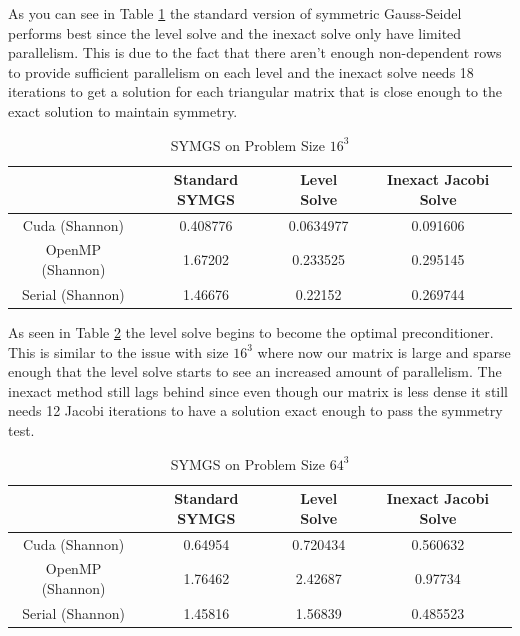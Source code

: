\documentclass{ccr15}
\begin{document}
As you can see in Table \ref{SYMGS16} the standard version of symmetric Gauss-Seidel performs
best since the level solve and the inexact solve only have limited parallelism. This is due to
the fact that there aren't enough non-dependent rows to provide sufficient parallelism on each
level and the inexact solve needs 18 iterations to get a solution for each triangular matrix that
is close enough to the exact solution to maintain symmetry.

\begin{table}[h]
\begin{center}
\begin{tabular}{|c||c|c|c|}
\hline
 & Standard SYMGS & Level Solve & Inexact Jacobi Solve \\
 \hline \hline
 Cuda (Shannon) & 0.408776 & 0.0634977 & 0.091606 \\
 \hline
 OpenMP (Shannon) & 1.67202 & 0.233525 & 0.295145 \\
 \hline
 Serial (Shannon) & 1.46676 & 0.22152 & 0.269744 \\
 \hline
\end{tabular}
\caption{SYMGS on Problem Size $16^3$}
\label{SYMGS16}
\end{center}
\end{table}

As seen in Table \ref{SYMGS64} the level solve begins to become the optimal preconditioner. This
is similar to the issue with size $16^3$ where now our matrix is large and sparse enough that
the level solve starts to see an increased amount of parallelism. The inexact method still lags
behind since even though our matrix is less dense it still needs 12 Jacobi iterations to have
a solution exact enough to pass the symmetry test.

\begin{table}[h]
\begin{center}
\begin{tabular}{|c||c|c|c|}
\hline
& Standard SYMGS & Level Solve & Inexact Jacobi Solve \\
\hline \hline
Cuda (Shannon) & 0.64954 & 0.720434 & 0.560632 \\
\hline
OpenMP (Shannon) & 1.76462 & 2.42687 & 0.97734 \\
\hline
Serial (Shannon) & 1.45816 & 1.56839 & 0.485523 \\
\hline
\end{tabular}
\caption{SYMGS on Problem Size $64^3$}
\label{SYMGS64}
\end{center}
\end{table}
\end{document}
